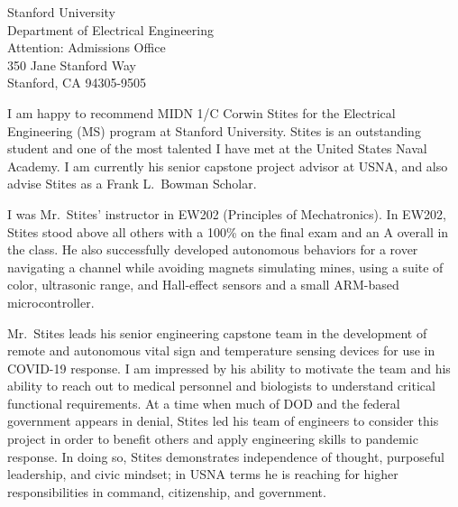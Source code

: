 \documentclass[10pt]{wrceletter}
\date{\today}
\begin{document}
\begin{letter}{%
Stanford University\\
Department of Electrical Engineering\\
Attention: Admissions Office\\
350 Jane Stanford Way\\
Stanford, CA 94305-9505}

\opening{}
\raggedright %
\setlength{\parindent}{15pt} %
I am happy to recommend MIDN 1/C Corwin Stites for the Electrical Engineering (MS) program at Stanford University.  Stites is an outstanding student and one of the most talented I have met at the United States Naval Academy. I am currently his senior capstone project advisor at USNA, and also advise Stites as a Frank L.~Bowman Scholar. 

I was Mr.~Stites' instructor in EW202 (Principles of Mechatronics).  In EW202, Stites stood above all others with a 100\% on the final exam and an A overall in the class. He also successfully developed autonomous behaviors for a rover navigating a channel while avoiding magnets simulating mines, using a suite of color, ultrasonic range, and Hall-effect sensors and a small ARM-based microcontroller. 

Mr.~Stites leads his senior engineering capstone team in the development of remote and autonomous vital sign and temperature sensing devices for use in COVID-19 response. I am impressed by his ability to motivate the team and his ability to reach out to medical personnel and biologists to understand critical functional requirements. At a time when much of DOD and the federal government appears in denial, Stites led his team of engineers to consider this project in order to benefit others and apply engineering skills to pandemic response. In doing so, Stites demonstrates independence of thought, purposeful leadership, and civic mindset; in USNA terms he is reaching for higher responsibilities in command, citizenship, and government.


\end{letter}
\end{document}
